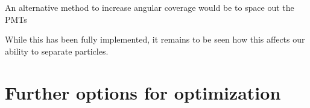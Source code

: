 An alternative method to increase angular coverage would be to space out the PMTs

While this has been fully implemented, it remains to be seen how this affects our ability to separate particles. 

\section{Further options for optimization}


\endinput 

Any text after an \endinput is ignored.
You could put scraps here or things in progress.
